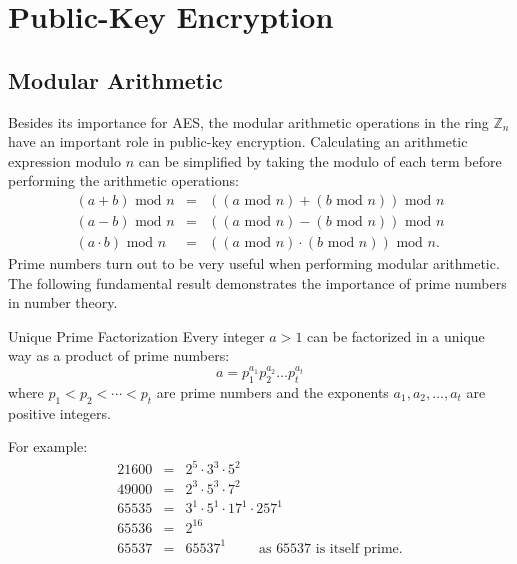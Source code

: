 
\chapter{Public-Key Encryption}


\section{Modular Arithmetic}


Besides its importance for AES, the modular arithmetic operations in the ring
$\mathbb{Z}_n$ have an important role in public-key encryption.
Calculating an arithmetic expression modulo $n$ can be simplified by taking the modulo of
each term before performing the arithmetic operations:
\begin{eqnarray*}
  (a+b)\mbox{ mod }n &=& ((a\mbox{ mod }n)+(b\mbox{ mod }n))\mbox{ mod }n \\
  (a-b)\mbox{ mod }n &=& ((a\mbox{ mod }n)-(b\mbox{ mod }n))\mbox{ mod }n \\
  (a\cdot b)\mbox{ mod }n &=& ((a\mbox{ mod }n)\cdot(b\mbox{ mod }n))\mbox{ mod }n.
\end{eqnarray*}
Prime numbers turn out to be very useful when performing modular arithmetic.
The following fundamental result demonstrates the importance of prime numbers in number theory.

\begin{theorem}{Unique Prime Factorization}
Every integer $a>1$ can be factorized in a unique way as a product of prime numbers:
\begin{displaymath}
  a = p_1^{a_1} p_2^{a_2} \dots p_t^{a_t}
\end{displaymath}
where $p_1<p_2<\cdots<p_t$ are prime numbers and the exponents
$a_1,a_2,\dots,a_t$ are positive integers.
\end{theorem}

For example:
\begin{eqnarray*}
  21600 &=& 2^5\cdot3^3\cdot5^2 \\
  49000 &=& 2^3\cdot5^3\cdot7^2 \\
  65535 &=& 3^1\cdot5^1\cdot17^1\cdot257^1 \\
  65536 &=& 2^{16} \\
  65537 &=& 65537^1 \qquad\mbox{ as $65537$ is itself prime}.
\end{eqnarray*}

